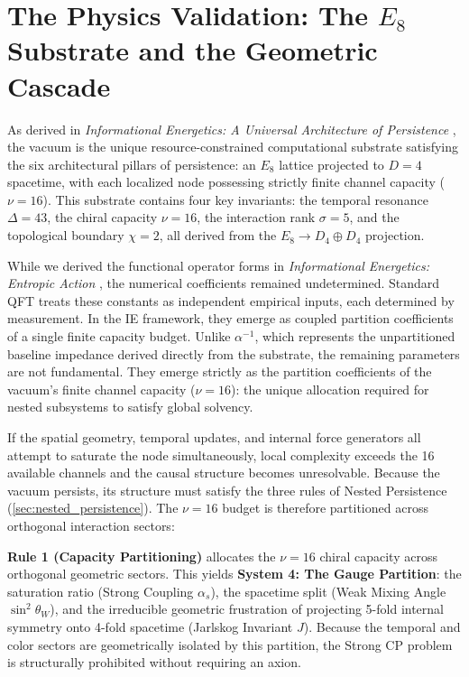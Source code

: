 \section{The Physics Validation: The \texorpdfstring{$E_8$}{E8} Substrate and the Geometric Cascade}
\label{sec:physics_validation}

As derived in \textit{Informational Energetics: A Universal Architecture of Persistence} \cite{meyer_informational_2026}, the vacuum is the unique resource-constrained computational substrate satisfying the six architectural pillars of persistence: an $E_8$ lattice projected to $D=4$ spacetime, with each localized node possessing strictly finite channel capacity ($\nu = 16$). This substrate contains four key invariants: the temporal resonance $\Delta=43$, the chiral capacity $\nu=16$, the interaction rank $\sigma=5$, and the topological boundary $\chi=2$, all derived from the $E_8 \rightarrow D_4 \oplus D_4$ projection.

While we derived the functional operator forms in \textit{Informational Energetics: Entropic Action} \cite{meyer_ieaction_2026}, the numerical coefficients remained undetermined. Standard QFT treats these constants as independent empirical inputs, each determined by measurement. In the IE framework, they emerge as coupled partition coefficients of a single finite capacity budget. Unlike $\alpha^{-1}$, which represents the unpartitioned baseline impedance derived directly from the substrate, the remaining parameters are not fundamental. They emerge strictly as the partition coefficients of the vacuum's finite channel capacity ($\nu = 16$): the unique allocation required for nested subsystems to satisfy global solvency.

If the spatial geometry, temporal updates, and internal force generators all attempt to saturate the node simultaneously, local complexity exceeds the 16 available channels and the causal structure becomes unresolvable. Because the vacuum persists, its structure must satisfy the three rules of Nested Persistence (\cref{sec:nested_persistence}). The $\nu = 16$ budget is therefore partitioned across orthogonal interaction sectors:

\textbf{Rule 1 (Capacity Partitioning)} allocates the $\nu = 16$ chiral capacity across orthogonal geometric sectors. This yields \textbf{System 4: The Gauge Partition}: the saturation ratio (Strong Coupling $\alpha_s$), the spacetime split (Weak Mixing Angle $\sin^2\theta_W$), and the irreducible geometric frustration of projecting 5-fold internal symmetry onto 4-fold spacetime (Jarlskog Invariant $J$). Because the temporal and color sectors are geometrically isolated by this partition, the Strong CP problem is structurally prohibited without requiring an axion.

